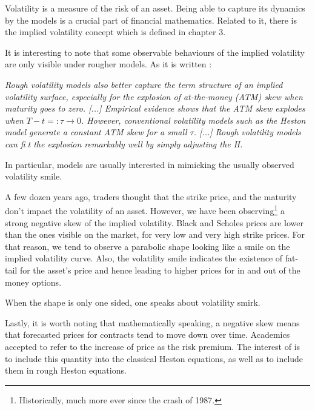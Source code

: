 \begin{definition}[Volatility]
Volatility is a measure of the risk of an asset. Being able to capture its dynamics by the models is a crucial part of financial mathematics. Related to it, there is the implied volatility concept which is defined in chapter 3.
\end{definition}

It is interesting to note that some observable behaviours of the implied volatility are only visible under rougher models. As it is written \cite{HanWong}:

\textit{Rough volatility models also better capture the term structure of an implied volatility surface, especially for the explosion of at-the-money (ATM) skew when maturity goes to zero. [...] Empirical evidence shows that the ATM skew explodes when $T-t =: \tau \to 0 $. However, conventional volatility models such as the Heston model generate a constant ATM skew for a small $\tau$. [...] Rough volatility models can fit the explosion remarkably well by simply adjusting the H.}

In particular, models are usually interested in mimicking the usually observed volatility smile.

\begin{definition}
A few dozen years ago, traders thought that the strike price, and the maturity don't impact the volatility of an asset. However, we have been observing\footnote{Historically, much more ever since the crash of 1987.} a strong negative skew of the implied volatility. Black and Scholes prices are lower than the ones visible on the market, for very low and very high strike prices. For that reason, we tend to observe a parabolic shape looking like a smile on the implied volatility curve. Also, the volatility smile indicates the existence of fat-tail for the asset's price and hence leading to higher prices for in and out of the money options.
\end{definition}

When the shape is only one sided, one speaks about volatility smirk.

Lastly, it is worth noting that mathematically speaking, a negative skew means that forecasted prices for contracts tend to move down over time. Academics accepted to refer to the increase of price as the risk premium. The interest of \cite{HanWong} is to include this quantity into the classical Heston equations, as well as to include them in rough Heston equations.




